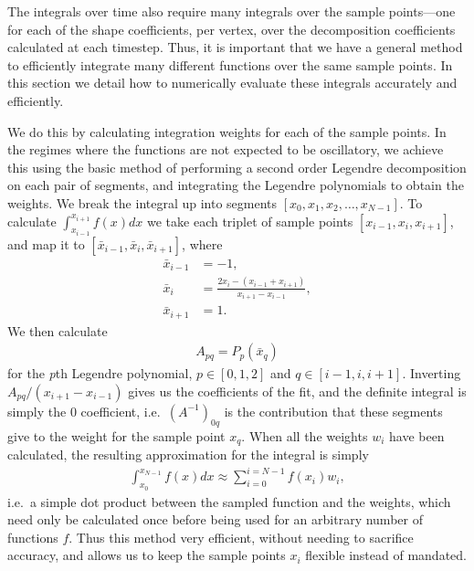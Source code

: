     The integrals over time also require many integrals over the sample points---one
    for each of the shape coefficients, per vertex, over the decomposition
    coefficients calculated at each timestep.
    Thus, it is important that we have a general method to efficiently integrate many different functions
    over the same sample points.
    In this section we detail how to numerically evaluate these
    integrals accurately and efficiently.


    We do this by calculating integration weights for each of the sample points.
    In the regimes where the functions are not expected to be oscillatory, we achieve this
    using the basic method of performing a second order Legendre decomposition on each pair
    of segments, and integrating the Legendre polynomials to obtain the weights.
    We break the integral up into segments $[x_0, x_1, x_2,\ldots,x_{N-1}]$.
    To calculate $\int_{x_{i-1}}^{x_{i+1}}f(x)dx$ we take each triplet of
    sample points $[x_{i-1}, x_{i}, x_{i+1}]$, and map it to $[\bar{x}_{i-1}, \bar{x}_{i}, \bar{x}_{i+1}]$,
    where
    \begin{align}
        \bar{x}_{i-1} &= -1,\\
        \bar{x}_i     &= \frac{2x_i-(x_{i-1}+x_{i+1})}{x_{i+1}-x_{i-1}},\\
        \bar{x}_{i+1} &= 1.
    \end{align}
    We then calculate
    \begin{align}
        A_{pq} = P_p(\bar{x}_q)
    \end{align}
    for the \textit{p}th Legendre polynomial, $p\in[0,1,2]$ and $q\in[i-1,i,i+1]$.
    Inverting $A_{pq}/(x_{i+1}-x_{i-1})$ gives us the coefficients of the
    fit, and the definite integral is simply the $0$ coefficient,
    i.e.\ $\left(A^{-1}\right)_{0q}$ is the contribution that these segments give to
    the weight for the sample point $x_q$. When all the weights $w_i$ have been calculated,
    the resulting approximation for the integral is simply
    \begin{align}
        \int_{x_{0}}^{x_{N-1}}f(x)dx\approx\sum_{i=0}^{i=N-1}f(x_i)w_i,
    \end{align}
    i.e.\ a simple dot product between the sampled function and the weights,
    which need only be calculated once before being used for an arbitrary number of functions $f$.
    Thus this method very efficient, without needing to sacrifice accuracy,
    and allows us to keep the sample points $x_i$ flexible instead of mandated.



